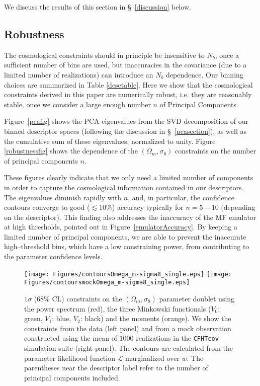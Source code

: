 \documentclass[reprint,aps,prd,superscriptaddress,showkeys,showpacs]{revtex4-1}
\begin{document}
We discuss the results of this section in \S~\ref{discussion} below.


\subsection{Robustness}

The cosmological constraints should in principle be insensitive to
$N_b$, once a sufficient number of bins are used, but inaccuracies in
the covariance (due to a limited number of realizations) can introduce
an $N_b$ dependence. Our binning choices are summarized in Table \ref{desctable}.  
Here we show that the cosmological constraints
derived in this paper are numerically robust, i.e. they are reasonably
stable, once we consider a large enough number $n$ of Principal
Components. 

Figure~\ref{pcafig} shows the PCA eigenvalues from the SVD
decomposition of our binned descriptor spaces (following the
discussion in \S~\ref{pcasection}), as well as the cumulative sum of
these eigenvalues, normalized to unity. Figure \ref{robustnessfig}
shows the dependence of the $(\Omega_m,\sigma_8)$ constraints on the
number of principal components $n$.  

These figures clearly indicate that we only need a limited number of
components in order to capture the cosmological information contained
in our descriptors. The eigenvalues diminish rapidly with $n$, and, in
particular, the confidence contours converge to good ($\lesssim 10\%$)
accuracy typically for $n=5-10$ (depending on the descriptor).
This finding also addresses the inaccuracy of the MF emulator at high
thresholds, pointed out in Figure~\ref{emulatorAccuracy}. By keeping a
limited number of principal components, we are able to prevent the
inaccurate high--threshold bins, which have a low constraining power,
from contributing to the parameter confidence levels.

\begin{figure*}
\begin{center}
\texttt{[image: Figures/contoursOmega\_m-sigma8\_single.eps]}
\texttt{[image: Figures/contoursmockOmega\_m-sigma8\_single.eps]}
\end{center}
\caption{$1\sigma$ (68\% CL) constraints on the $(\Omega_m,\sigma_8)$
  parameter doublet using the power spectrum (red), the three
  Minkowski functionals ($V_0$: green, $V_1$: blue, $V_2$: black) and
  the moments (orange). We show the constraints from the data (left
  panel) and from a mock observation constructed using the mean of
  1000 realizations in the \texttt{CFHTcov} simulation suite (right
  panel). The contours are calculated from the parameter likelihood
  function $\mathcal{L}$ marginalized over $w$. The parentheses near
  the descriptor label refer to the number of principal components
  included.}
\label{contours3single}
\end{figure*}
\end{document}
